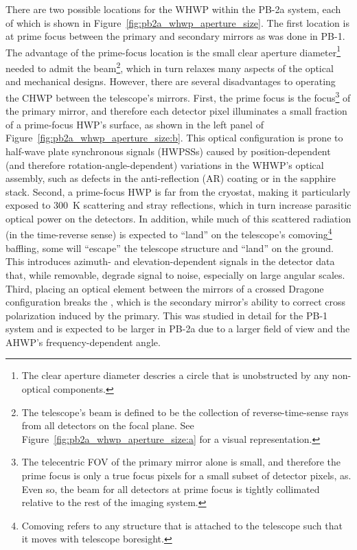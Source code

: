 There are two possible locations for the WHWP within the PB-2a system, each of which is shown in Figure~\ref{fig:pb2a_whwp_aperture_size}. The first location is at prime focus between the primary and secondary mirrors as was done in PB-1. The advantage of the prime-focus location is the small clear aperture diameter\footnote{The clear aperture diameter descries a circle that is unobstructed by any non-optical components.} needed to admit the beam\footnote{The telescope's beam is defined to be the collection of reverse-time-sense rays from all detectors on the focal plane. See Figure~\ref{fig:pb2a_whwp_aperture_size:a} for a visual representation.}, which in turn relaxes many aspects of the optical and mechanical designs. However, there are several disadvantages to operating the CHWP between the telescope's mirrors. First, the prime focus is the focus\footnote{The telecentric FOV of the primary mirror alone is small, and therefore the prime focus is only a true focus pixels for a small subset of detector pixels, as. Even so, the beam for all detectors at prime focus is tightly collimated relative to the rest of the imaging system.} of the primary mirror, and therefore each detector pixel illuminates a small fraction of a prime-focus HWP's surface, as shown in the left panel of Figure~\ref{fig:pb2a_whwp_aperture_size:b}. This optical configuration is prone to half-wave plate synchronous signals (HWPSSs) caused by position-dependent (and therefore rotation-angle-dependent) variations in the WHWP's optical assembly, such as defects in the anti-reflection (AR) coating or in the sapphire stack. Second, a prime-focus HWP is far from the cryostat, making it particularly exposed to 300~K scattering and stray reflections, which in turn increase parasitic optical power on the detectors. In addition, while much of this scattered radiation (in the time-reverse sense) is expected to ``land'' on the telescope's comoving\footnote{Comoving refers to any structure that is attached to the telescope such that it moves with telescope boresight.} baffling, some will ``escape'' the telescope structure and ``land'' on the ground. This  introduces azimuth- and elevation-dependent signals in the detector data that, while removable, degrade signal to noise, especially on large angular scales. Third, placing an optical element between the mirrors of a crossed Dragone configuration breaks the , which is the secondary mirror's ability to correct cross polarization induced by the primary. This  was studied in detail for the PB-1 system and is expected to be larger in PB-2a due to a larger field of view and the AHWP's frequency-dependent angle.

